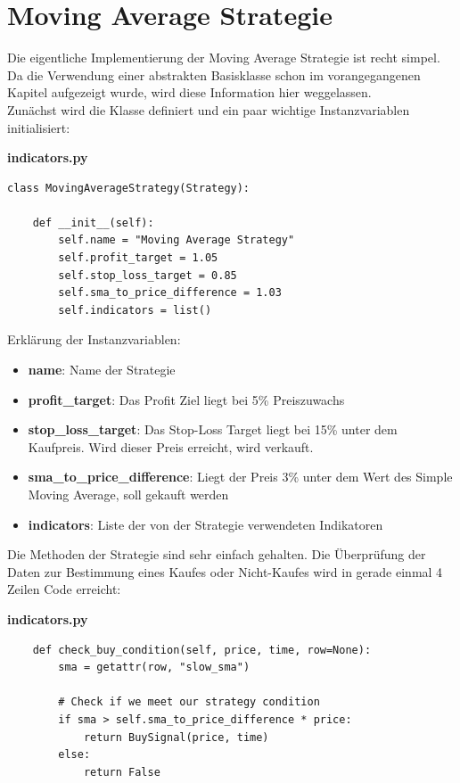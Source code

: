 \documentclass[oneside]{ausarbeitung}
\begin{document}

\section{Moving Average Strategie}
\label{sec:moving_average_strategie}

Die eigentliche Implementierung der Moving Average Strategie ist recht simpel. Da die Verwendung einer abstrakten Basisklasse schon im vorangegangenen Kapitel aufgezeigt wurde, wird diese Information hier weggelassen. \\
Zunächst wird die Klasse definiert und ein paar wichtige Instanzvariablen initialisiert:

\lstset{language=Python}
\lstset{frame=lines}
\lstset{basicstyle=\footnotesize}
\textbf{indicators.py}
\begin{lstlisting}
class MovingAverageStrategy(Strategy):

	def __init__(self):
		self.name = "Moving Average Strategy"
		self.profit_target = 1.05
		self.stop_loss_target = 0.85
		self.sma_to_price_difference = 1.03
		self.indicators = list()
\end{lstlisting}

Erklärung der Instanzvariablen:
\begin{itemize}
	\item \textbf{name}: Name der Strategie
	\item \textbf{profit\_target}: Das Profit Ziel liegt bei 5\% Preiszuwachs
	\item \textbf{stop\_loss\_target}: Das Stop-Loss Target liegt bei 15\% unter
		dem Kaufpreis. Wird dieser Preis erreicht, wird verkauft.
	\item \textbf{sma\_to\_price\_difference}: Liegt der Preis 3\% unter dem Wert
		des Simple Moving Average, soll gekauft werden
	\item \textbf{indicators}: Liste der von der Strategie verwendeten Indikatoren
\end{itemize}

Die Methoden der Strategie sind sehr einfach gehalten. Die Überprüfung der Daten zur Bestimmung eines Kaufes oder Nicht-Kaufes wird in gerade einmal 4 Zeilen Code erreicht:

\lstset{language=Python}
\lstset{frame=lines}
\lstset{basicstyle=\footnotesize}
\textbf{indicators.py}
\begin{lstlisting}
    def check_buy_condition(self, price, time, row=None):
		sma = getattr(row, "slow_sma")

		# Check if we meet our strategy condition
		if sma > self.sma_to_price_difference * price:
			return BuySignal(price, time)
		else:
			return False
\end{lstlisting}
\end{document}

